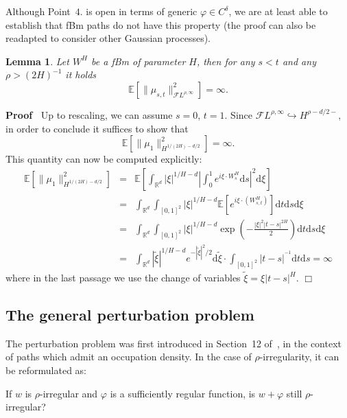 \documentclass[10pt]{article}
\newcommand{\mathd}{\mathrm{d}}
\newenvironment{proof}{\noindent\textbf{Proof\ }}{\hspace*{\fill}$\Box$\medskip}
\newtheorem{lemma}[theorem]{Lemma}
\begin{document}
Although Point~$4.$ is open in terms of generic $\varphi \in C^{\delta}$, we
are at least able to establish that fBm paths do not have this property (the
proof can also be readapted to consider other Gaussian processes).

\begin{lemma}
  Let $W^H$ be a fBm of parameter $H$, then for any $s < t$ and any $\rho > (2
  H)^{- 1}$ it holds
  \[ \mathbb{E} [\| \mu_{s, t} \|_{\mathcal{F} L^{\rho, \infty}}^2] = \infty
     . \]
\end{lemma}

\begin{proof}
  Up to rescaling, we can assume $s = 0$, $t = 1$. Since $\mathcal{F} L^{\rho,
  \infty} \hookrightarrow H^{\rho - d / 2 -}$, in order to conclude it
  suffices to show that
  \[ \mathbb{E} [\| \mu_1 \|^2_{H^{1 / (2 H) - d / 2}}] = \infty . \]
  This quantity can now be computed explicitly:
  \begin{eqnarray*}
    \mathbb{E} [\| \mu_1 \|^2_{H^{1 / (2 H) - d / 2}}] & = & \mathbb{E} \left[
    \int_{\mathbb{R}^d} | \xi |^{1 / H - d} \left| \int_0^1 e^{i \xi \cdot
    W^H_s} \mathd s \right|^2 \mathd \xi \right]\\
    & = & \int_{\mathbb{R}^d} \int_{[0, 1]^2} | \xi |^{1 / H - d} \mathbb{E}
    [e^{i \xi \cdot (W^H_{s, t})}] \mathd t \mathd s \mathd \xi\\
    & = & \int_{\mathbb{R}^d} \int_{[0, 1]^2} | \xi |^{1 / H - d} \exp \left(
    - \frac{| \xi |^2 | t - s |^{2 H}}{2} \right) \mathd t \mathd s \mathd
    \xi\\
    & = & \int_{\mathbb{R}^d} | \tilde{\xi} |^{1 / H - d} e^{- | \tilde{\xi}
    |^2 / 2} \mathd \tilde{\xi} \cdot \int_{[0, 1]^2} | t - s |^{^{- 1}}
    \mathd t \mathd s = \infty
  \end{eqnarray*}
  where in the last passage we use the change of variables $\tilde{\xi} = \xi
  | t - s |^H$.
\end{proof}

\subsection{The general perturbation problem}\label{sec5.3}

The perturbation problem was first introduced in Section~12 of~{\cite{geman}},
in the context of paths which admit an occupation density. In the case of
$\rho$\mbox{-}irregularity, it can be reformulated as:

\begin{center}
  If $w$ is $\rho$-irregular and $\varphi$ is a sufficiently regular function,
  is $w + \varphi$ still $\rho$-irregular?
\end{center}
\end{document}
